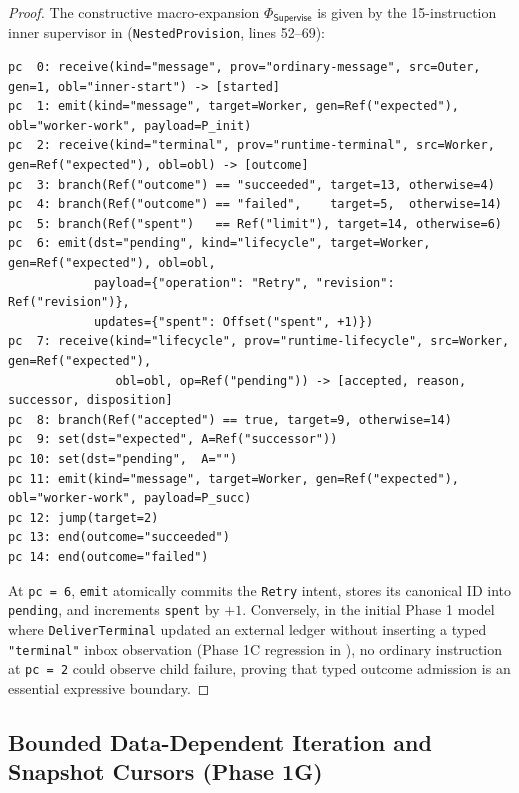 \documentclass[11pt,a4paper]{article}
\theoremstyle{definition}
\theoremstyle{remark}
\begin{document}
\begin{proof}
The constructive macro-expansion $\Phi_{\mathsf{Supervise}}$ is given by the 15-instruction inner supervisor in  (\texttt{NestedProvision}, lines 52--69):
\begin{lstlisting}[style=alancode]
pc  0: receive(kind="message", prov="ordinary-message", src=Outer, gen=1, obl="inner-start") -> [started]
pc  1: emit(kind="message", target=Worker, gen=Ref("expected"), obl="worker-work", payload=P_init)
pc  2: receive(kind="terminal", prov="runtime-terminal", src=Worker, gen=Ref("expected"), obl=obl) -> [outcome]
pc  3: branch(Ref("outcome") == "succeeded", target=13, otherwise=4)
pc  4: branch(Ref("outcome") == "failed",    target=5,  otherwise=14)
pc  5: branch(Ref("spent")   == Ref("limit"), target=14, otherwise=6)
pc  6: emit(dst="pending", kind="lifecycle", target=Worker, gen=Ref("expected"), obl=obl,
            payload={"operation": "Retry", "revision": Ref("revision")},
            updates={"spent": Offset("spent", +1)})
pc  7: receive(kind="lifecycle", prov="runtime-lifecycle", src=Worker, gen=Ref("expected"),
               obl=obl, op=Ref("pending")) -> [accepted, reason, successor, disposition]
pc  8: branch(Ref("accepted") == true, target=9, otherwise=14)
pc  9: set(dst="expected", A=Ref("successor"))
pc 10: set(dst="pending",  A="")
pc 11: emit(kind="message", target=Worker, gen=Ref("expected"), obl="worker-work", payload=P_succ)
pc 12: jump(target=2)
pc 13: end(outcome="succeeded")
pc 14: end(outcome="failed")
\end{lstlisting}
At \texttt{pc = 6}, \texttt{emit} atomically commits the \texttt{Retry} intent, stores its canonical ID into \texttt{pending}, and increments \texttt{spent} by $+1$. Conversely, in the initial Phase 1 model where \texttt{DeliverTerminal} updated an external ledger without inserting a typed \texttt{"terminal"} inbox observation (Phase 1C regression in ), no ordinary instruction at \texttt{pc = 2} could observe child failure, proving that typed outcome admission is an essential expressive boundary.
\end{proof}

\subsection{Bounded Data-Dependent Iteration and Snapshot Cursors (Phase 1G)}
\end{document}

